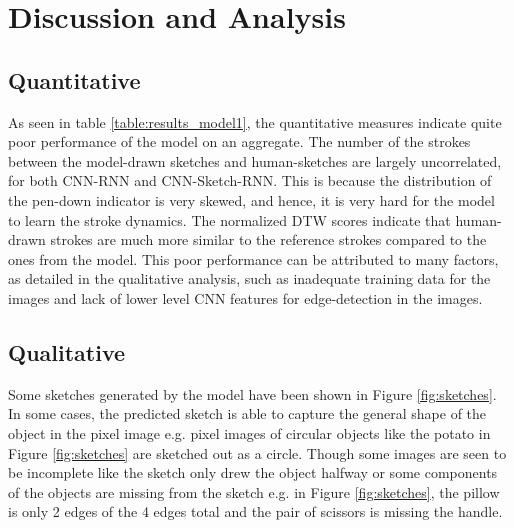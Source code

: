 \documentclass{article}
\begin{document}

\section{Discussion and Analysis}

\subsection{Quantitative}

As seen in table \ref{table:results_model1}, the quantitative measures indicate quite poor performance of the model on an aggregate. The number of the strokes between the model-drawn sketches and human-sketches are largely uncorrelated, for both CNN-RNN and CNN-Sketch-RNN. This is because the distribution of the pen-down indicator is very skewed, and hence, it is very hard for the model to learn the stroke dynamics. The normalized DTW scores indicate that human-drawn strokes are much more similar to the reference strokes compared to the ones from the model. This poor performance can be attributed to many factors, as detailed in the qualitative analysis, such as inadequate training data for the images and lack of lower level CNN features for edge-detection in the images.

\subsection{Qualitative}

Some sketches generated by the model have been shown in Figure \ref{fig:sketches}. In some cases, the predicted sketch is able to capture the general shape of the object in the pixel image e.g. pixel images of circular objects like the potato in Figure \ref{fig:sketches} are sketched out as a circle. Though some images are seen to be incomplete like the sketch only drew the object halfway or some components of the objects are missing from the sketch e.g. in Figure \ref{fig:sketches}, the pillow is only 2 edges of the 4 edges total and the pair of scissors is missing the handle.
\end{document}
